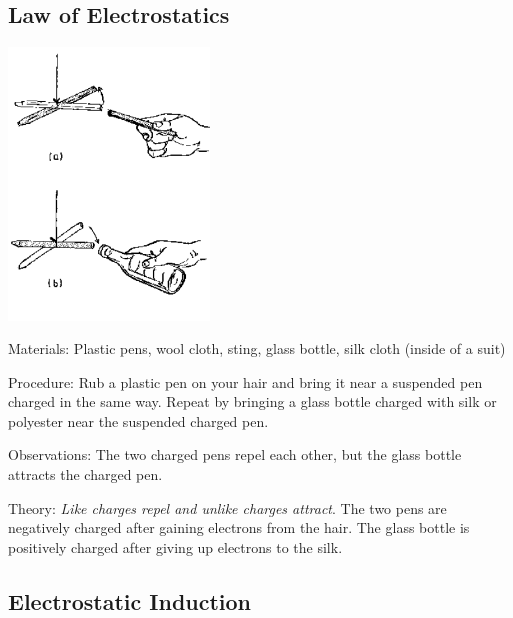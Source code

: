 \begin{multicols}{2}
\vfill
\columnbreak

\subsection{Law of Electrostatics}

\begin{center}
\includegraphics[width=0.4\textwidth]{./img/source/law-electrostatics.png}
\end{center}

\begin{description*}
\item[Materials:]{Plastic pens, wool cloth, sting, glass bottle, silk cloth (inside of a suit)}
\item[Procedure:]{Rub a plastic pen on your hair and bring it near a suspended pen charged in the same way. Repeat by bringing a glass bottle charged with silk or polyester near the suspended charged pen.}
\item[Observations:]{The two charged pens repel each other, but the glass bottle attracts the charged pen.}
\item[Theory:]{\emph{Like charges repel and unlike charges attract}. The two pens are negatively charged after gaining electrons from the hair. The glass bottle is positively charged after giving up electrons to the silk.}
\end{description*}

\vfill
\columnbreak

\subsection{Electrostatic Induction}


\end{multicols}
